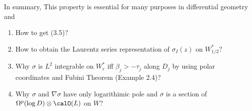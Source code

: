 \documentclass[lang=en,12pt]{beautybook}
\begin{document}
\begin{remark}
  In summary,{} This property is
  essential for many purposes in differential geometry and {}
\end{remark}
\begin{problem}
\begin{enumerate}
  \item How to get (3.5)?
  \item How to obtain the Laurentz series representation of $\sigma_I(z)$ on $W_{1/2}^*$?
  \item Why $\sigma$ is $L^2$ integrable on $W_r^*$ iff $\beta_j>-\tau_j$ along $D_j$ by using polar coordinates and Fubini Theorem (Example 2.4)?
  \item Why $\sigma$ and $\nabla \sigma$ have only logarithimic pole and $\sigma$ is a section of $\Omega^p(\log D)\otimes\calO(L)$ on $W$?
\end{enumerate}
\end{problem}
\end{document}
